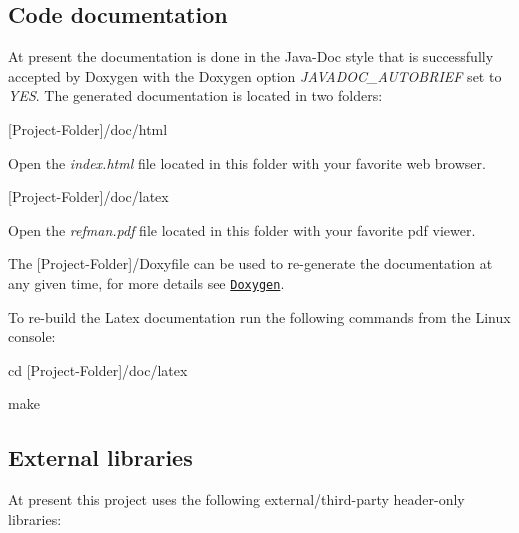 \subsection*{Code documentation}

At present the documentation is done in the Java-\/\+Doc style that is successfully accepted by Doxygen with the Doxygen option {\itshape J\+A\+V\+A\+D\+O\+C\+\_\+\+A\+U\+T\+O\+B\+R\+I\+E\+F} set to {\itshape Y\+E\+S}. The generated documentation is located in two folders\+:


\begin{DoxyItemize}
\item {\ttfamily \mbox{[}Project-\/\+Folder\mbox{]}/doc/html}
\begin{DoxyItemize}
\item Open the {\itshape index.\+html} file located in this folder with your favorite web browser.
\end{DoxyItemize}
\item {\ttfamily \mbox{[}Project-\/\+Folder\mbox{]}/doc/latex}
\begin{DoxyItemize}
\item Open the {\itshape refman.\+pdf} file located in this folder with your favorite pdf viewer.
\end{DoxyItemize}
\end{DoxyItemize}

The {\ttfamily \mbox{[}Project-\/\+Folder\mbox{]}/\+Doxyfile} can be used to re-\/generate the documentation at any given time, for more details see \href{www.doxygen.org/}{\tt Doxygen}.


\begin{DoxyItemize}
\item To re-\/build the Latex documentation run the following commands from the Linux console\+:
\begin{DoxyItemize}
\item {\ttfamily cd \mbox{[}Project-\/\+Folder\mbox{]}/doc/latex}
\item {\ttfamily make}
\end{DoxyItemize}
\end{DoxyItemize}

\subsection*{External libraries}

At present this project uses the following external/third-\/party header-\/only libraries\+:

